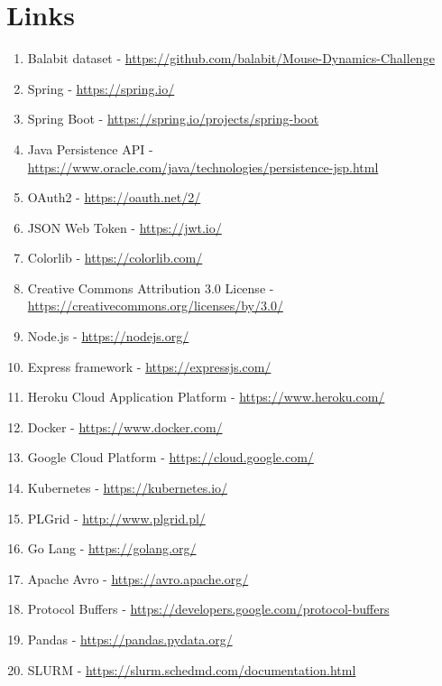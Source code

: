 \section{Links}\label{sec:links}
\begin{enumerate}
    \item Balabit dataset - \url{https://github.com/balabit/Mouse-Dynamics-Challenge}\label{itm:balabit}
    \item Spring - \url{https://spring.io/}\label{itm:spring}
    \item Spring Boot - \url{https://spring.io/projects/spring-boot}\label{itm:spring-boot}
    \item Java Persistence API - \url{https://www.oracle.com/java/technologies/persistence-jsp.html}\label{itm:jpa}
    \item OAuth2 - \url{https://oauth.net/2/}\label{itm:oauth2}
    \item JSON Web Token - \url{https://jwt.io/}\label{itm:jwt}
    \item Colorlib - \url{https://colorlib.com/}\label{itm:colorlib}
    \item Creative Commons Attribution 3.0 License - \url{https://creativecommons.org/licenses/by/3.0/}\label{itm:license}
    \item Node.js - \url{https://nodejs.org/}\label{itm:node}
    \item Express framework - \url{https://expressjs.com/}\label{itm:express}
    \item Heroku Cloud Application Platform - \url{https://www.heroku.com/}\label{itm:heroku}
    \item Docker - \url{https://www.docker.com/}\label{itm:docker}
    \item Google Cloud Platform - \url{https://cloud.google.com/}\label{itm:gcp}
    \item Kubernetes - \url{https://kubernetes.io/}\label{itm:kubernetes}
    \item PLGrid - \url{http://www.plgrid.pl/}\label{itm:plgrid}
    \item Go Lang - \url{https://golang.org/}\label{itm:golang}
    \item Apache Avro - \url{https://avro.apache.org/}\label{itm:avro}
    \item Protocol Buffers - \url{https://developers.google.com/protocol-buffers}\label{itm:protobuf}
    \item Pandas - \url{https://pandas.pydata.org/}\label{itm:pandas}
    \item SLURM - \url{https://slurm.schedmd.com/documentation.html}\label{itm:slurm}

\end{enumerate}
